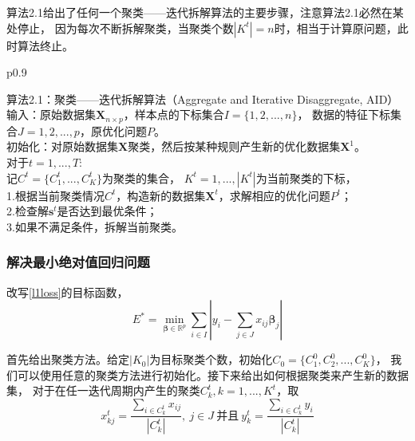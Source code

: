 算法2.1给出了任何一个聚类——迭代拆解算法的主要步骤，注意算法2.1必然在某处停止，
因为每次不断拆解聚类，当聚类个数$|K^{t}|= n$时，相当于计算原问题，此时算法终止。
\begin{table}[H]%
    \centering%
    \begin{tabular}{{p{0.9\columnwidth}}}%
    
    \toprule%
    算法2.1：聚类——迭代拆解算法（Aggregate and Iterative Disaggregate, AID） \\
    \midrule%
    输入：原始数据集$\bm{X}_{n\times p}$，样本点的下标集合${I} = \{1, 2, ..., n\}$，
    数据的特征下标集合${J} = {1, 2, ..., p}$，原优化问题$P$。\\
    初始化：对原始数据集$\bm{X}$聚类，然后按某种规则产生新的优化数据集$\bm{X}^{1}$。 \\
    对于$t = 1, ..., T$:\\
        记${C}^{t} = \{{C}_1^{t}, ..., C_K^{t}\}$为聚类的集合， $K^t = {1, ..., |K^t|}$为当前聚类的下标，
        \\
        1.根据当前聚类情况${C}^{t}$，构造新的数据集$\bm{X}^{t}$，求解相应的优化问题${P}^{t}$； \\
        2.检查解$\bm{s}^{t}$是否达到最优条件；\\
        3.如果不满足条件，拆解当前聚类。
        \\
    \bottomrule%
    \end{tabular}
\end{table}%

\subsubsection{解决最小绝对值回归问题}
改写\eqref{l1loss}的目标函数，
\begin{equation}\label{l1loss2}
E^* = \underset{\bm{\beta} \in \mathbb{R}^{p}}{\operatorname{min}} 
\sum_{i \in I}|y_i - \sum_{j \in J}x_{ij}\bm{\beta}_j|
\end{equation}

首先给出聚类方法。给定$|K_0|$为目标聚类个数，初始化$C_0 = \{C_1^0, C_2^0, ..., C_K^0\}$，
我们可以使用任意的聚类方法进行初始化。接下来给出如何根据聚类来产生新的数据集，
对于在任一迭代周期内产生的聚类$C^t_k, k = 1, ..., K^t$，取
\begin{equation*}
    x_{kj}^t = \frac{\sum_{i \in C_k^t}x_{ij}}{|C_k^t|},\ j \in J \  
    \text{并且} \
    y_{k}^t = \frac{\sum_{i \in C_k^t}y_i}{|C_k^t|}
\end{equation*}

